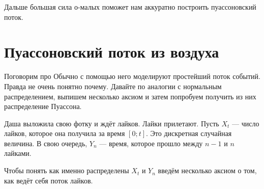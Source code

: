 \documentclass[12pt, a4paper, oneside]{article}
\begin{document}
Дальше большая сила о-малых поможет нам аккуратно построить пуассоновский поток. 

\section{Пуассоновский поток из воздуха}

Поговорим про  Обычно с помощью него моделируют простейший поток событий. Правда не очень понятно почему. Давайте по аналогии с нормальным распределением, выпишем несколько аксиом и затем попробуем получить из них распределение Пуассона. 

Даша выложила свою фотку и ждёт лайков. Лайки прилетают. Пусть $X_t$ --- число лайков, которое она получила за время $[0; t]$. Это дискретная случайная величина. В свою очередь, $Y_n$ --- время, которое прошло между $n-1$ и $n$ лайками. 

\begin{center} 
\end{center} 

Чтобы понять как именно распределены $X_t$ и $Y_n$ введём несколько аксиом о том, как ведёт себя поток лайков. 
\end{document}
